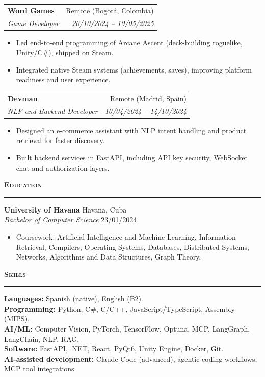 \documentclass[11pt,a4paper]{article}
\makeatletter
\newcommand{\cvsection}[1]{
  \vspace{0.45em}
  {\large\textbf{\textcolor{primary}{\textsc{#1}}}}\\[-0.35em]
  {\color{rulegray}\rule{\linewidth}{0.6pt}}
  \vspace{0.15em}
}
\newcommand{\cvjob}[4]{
  \begin{tabularx}{\linewidth}{@{}Xr@{}}
    \textbf{#1} & \textcolor{textmuted}{#2}\\
    \textit{#3} & \textit{\textcolor{textmuted}{#4}}
  \end{tabularx}
}
\newcommand{\tightitems}{
  \setlength{\itemsep}{0.1em}
  \setlength{\parskip}{0em}
  \setlength{\parsep}{0em}
}
\makeatother
\begin{document}
\cvjob{Word Games}{Remote (Bogot\'a, Colombia)}{Game Developer}{20/10/2024 -- 10/05/2025}
\begin{itemize}
  \tightitems
  \item Led end-to-end programming of Arcane Ascent (deck-building roguelike, Unity/C\#), shipped on Steam.
  \item Integrated native Steam systems (achievements, saves), improving platform readiness and user experience.
\end{itemize}
\vspace{0.2em}

\cvjob{Devman}{Remote (Madrid, Spain)}{NLP and Backend Developer}{10/04/2024 -- 14/10/2024}
\begin{itemize}
  \tightitems
  \item Designed an e-commerce assistant with NLP intent handling and product retrieval for faster discovery.
  \item Built backend services in FastAPI, including API key security, WebSocket chat and authorization layers.
\end{itemize}

\cvsection{Education}
\textbf{University of Havana} \hfill Havana, Cuba\\
\textit{Bachelor of Computer Science} \hfill 23/01/2024
\vspace{0.15em}
\begin{itemize}
  \tightitems
  \item Coursework: Artificial Intelligence and Machine Learning, Information Retrieval, Compilers, Operating Systems, Databases, Distributed Systems, Networks, Algorithms and Data Structures, Graph Theory.
\end{itemize}

\cvsection{Skills}
\textbf{Languages:} Spanish (native), English (B2).\\
\textbf{Programming:} Python, C\#, C/C++, JavaScript/TypeScript, Assembly (MIPS).\\
\textbf{AI/ML:} Computer Vision, PyTorch, TensorFlow, Optuna, MCP, LangGraph, LangChain, NLP, RAG.\\
\textbf{Software:} FastAPI, .NET, React, PyQt6, Unity Engine, Docker, Git.\\
\textbf{AI-assisted development:} Claude Code (advanced), agentic coding workflows, MCP tool integrations.
\end{document}
